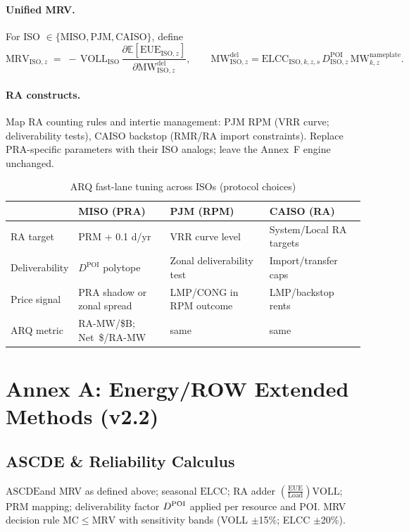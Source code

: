 \documentclass[11pt]{article}
\newcommand{\ELCC}{\ensuremath{\mathrm{ELCC}}}
\newcommand{\VOLL}{\ensuremath{\mathrm{VOLL}}}
\newcommand{\EUE}{\ensuremath{\mathrm{EUE}}}
\newcommand{\ASCDE}{\ensuremath{\mathrm{ASCDE}}}
\newcommand{\MRV}{\ensuremath{\mathrm{MRV}}}
\newcommand{\MC}{\ensuremath{\mathrm{MC}}}
\newcommand{\E}{\mathbb{E}}
\numberwithin{equation}{section}
\theoremstyle{definition}
\theoremstyle{remark}
\begin{document}
\paragraph{Unified MRV.}
For ISO $\in\{\text{MISO},\text{PJM},\text{CAISO}\}$, define
\[
\mathrm{MRV}_{\mathrm{ISO},z}
\;=\;
-\,\VOLL_{\mathrm{ISO}}\,
\frac{\partial \E[\mathrm{EUE}_{\mathrm{ISO},z}]}{\partial \mathrm{MW}^{\mathrm{del}}_{\mathrm{ISO},z}},
\qquad
\mathrm{MW}^{\mathrm{del}}_{\mathrm{ISO},z}
= \mathrm{ELCC}_{\mathrm{ISO},k,z,s}\,D^{\mathrm{POI}}_{\mathrm{ISO},z}\,\mathrm{MW}^{\text{nameplate}}_{k,z}.
\]
\paragraph{RA constructs.}
Map RA counting rules and intertie management: PJM RPM (VRR curve; deliverability tests), CAISO backstop (RMR/RA import constraints). Replace PRA-specific parameters with their ISO analogs; leave the Annex~F engine unchanged.

\begin{table}[h]
\centering
\caption{ARQ fast-lane tuning across ISOs (protocol choices)}
\begin{tabular}{@{}l p{3.2cm} p{3.2cm} p{3.2cm}@{}}
\toprule
 & \textbf{MISO (PRA)} & \textbf{PJM (RPM)} & \textbf{CAISO (RA)}\\
\midrule
RA target & PRM + 0.1 d/yr & VRR curve level & System/Local RA targets \\
Deliverability & $D^{\mathrm{POI}}$ polytope & Zonal deliverability test & Import/transfer caps \\
Price signal & PRA shadow or zonal spread & LMP/CONG in RPM outcome & LMP/backstop rents \\
ARQ metric & RA-MW/\$B; Net~\$/RA-MW & same & same \\
\bottomrule
\end{tabular}
\end{table}

\appendix

\section{Annex A: Energy/ROW Extended Methods (v2.2)}
\subsection*{ASCDE \& Reliability Calculus}
\noindent\ASCDE and MRV as defined above; seasonal $\ELCC$; RA adder $\left(\frac{\EUE}{\text{Load}}\right)\VOLL$; PRM mapping; deliverability factor $\Ddel$ applied per resource and POI. MRV decision rule $\MC\le\MRV$ with sensitivity bands (VOLL $\pm$15\%; ELCC $\pm$20\%).
\end{document}
